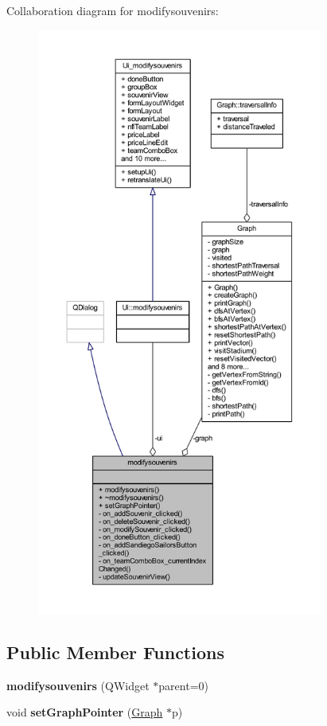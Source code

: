Collaboration diagram for modifysouvenirs\+:
\nopagebreak
\begin{figure}[H]
\begin{center}
\leavevmode
\includegraphics[height=550pt]{classmodifysouvenirs__coll__graph}
\end{center}
\end{figure}
\subsection*{Public Member Functions}
\begin{DoxyCompactItemize}
\item 
\mbox{\label{classmodifysouvenirs_ae8cf83ce05a01274522a341a8e081928}} 
{\bfseries modifysouvenirs} (Q\+Widget $\ast$parent=0)
\item 
\mbox{\label{classmodifysouvenirs_ad15ff72e8ed3361501972a0927f687ab}} 
void {\bfseries set\+Graph\+Pointer} (\hyperlink{class_graph}{Graph} $\ast$p)
\end{DoxyCompactItemize}
